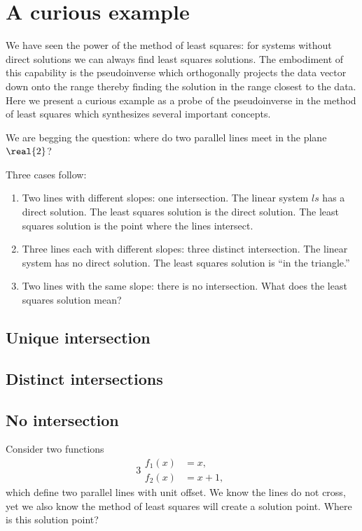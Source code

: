 \section{A curious example}

We have seen the power of the method of least squares: for systems without direct solutions we can always find least squares solutions. The embodiment of this capability is the pseudoinverse which orthogonally projects the data vector down onto the range thereby finding the solution in the range closest to the data. Here we present a curious example as a probe of the pseudoinverse in the method of least squares which synthesizes several important concepts.

We are begging the question: where do two parallel lines meet in the plane $\real{2}$?

Three cases follow:
\begin{enumerate}
\item Two lines with different slopes: one intersection. The linear system $ls$ has a direct solution. The least squares solution is the direct solution. The least squares solution is the point where the lines intersect.
\item Three lines each with different slopes: three distinct intersection. The linear system has no direct solution. The least squares solution is ``in the triangle.'' 
\item Two lines with the same slope: there is no intersection. What does the least squares solution mean?
\end{enumerate}

\subsection{Unique intersection}

\subsection{Distinct intersections}

\subsection{No intersection}
Consider two functions
\begin{equation}3
\begin{split}
  f_{1}(x) &= x,\\
  f_{2}(x) &= x + 1,
  \label{eq:curious:no:system}
\end{split}
\end{equation}
which define two parallel lines with unit offset. We know the lines do not cross, yet we also know the method of least squares will create a solution point. Where is this solution point?

